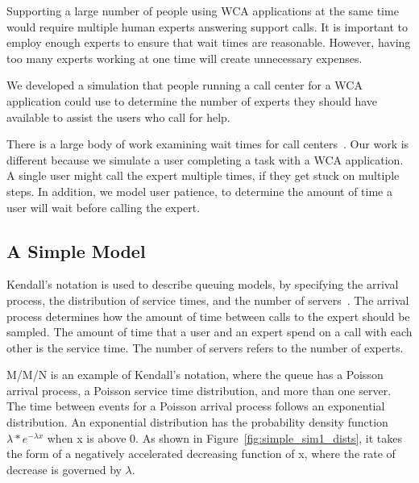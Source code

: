 Supporting a large number of people using WCA applications at the same time
would require multiple human experts answering support calls.
It is important to employ enough experts to ensure that wait times are
reasonable.
However, having too many experts working at one time will create unnecessary
expenses.

We developed a simulation that people running a call center for a WCA
application could use to determine the number of experts they should have
available to assist the users who call for help.

There is a large body of work examining wait times for call
centers~\cite{queue1, queue2}.
Our work is different because we simulate a user completing a task with a WCA
application.
A single user might call the expert multiple times, if they get stuck on
multiple steps.
In addition, we model user patience, to determine the amount of time a user will
wait before calling the expert.

\subsection{A Simple Model}\label{sec:simple}

Kendall's notation is used to describe queuing models, by specifying the arrival
process, the distribution of service times, and the number of
servers~\cite{kendall}.
The arrival process determines how the amount of time between calls to the
expert should be sampled.
The amount of time that a user and an expert spend on a call with each other is
the service time.
The number of servers refers to the number of experts.

M/M/N is an example of Kendall's notation, where the queue has a Poisson arrival
process, a Poisson service time distribution, and more than one server.
The time between events for a Poisson arrival process follows an exponential
distribution.
An exponential distribution has the probability density function
$\lambda * e ^ {- \lambda x}$ when x is above 0.
As shown in Figure~\ref{fig:simple_sim1_dists}, it takes the form of a
negatively accelerated decreasing function of x, where the rate of decrease is
governed by $\lambda$.

